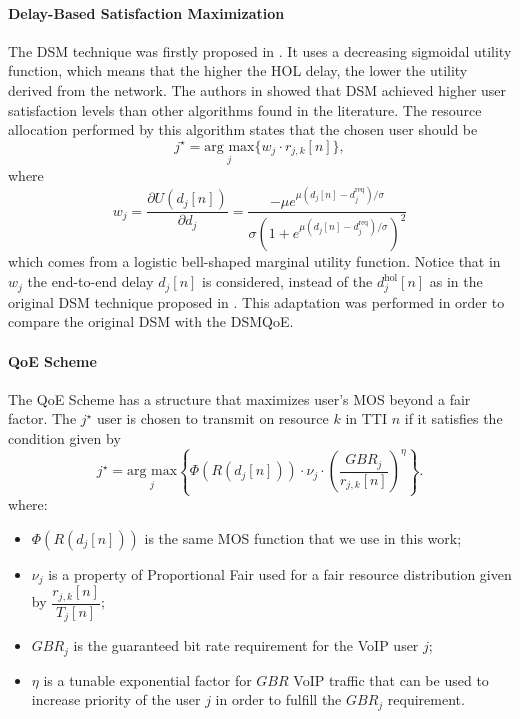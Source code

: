 \documentclass[conference]{IEEEtran}
\begin{document}
\paragraph{Delay-Based Satisfaction Maximization\\}
The \ac{DSM} technique was firstly proposed in \cite{Rodrigues2014_Wiley}. It uses a decreasing sigmoidal utility function, which means that the higher the HOL delay, the lower the utility derived from the network. The authors in \cite{Rodrigues2014_Wiley} showed that DSM achieved higher user satisfaction levels than other algorithms found in the literature. The resource allocation performed by this algorithm states that the chosen user should be 
\begin{equation}
\label{Eq:DSMArgmax}
j^{\star} = \underset{j}{\text{arg max}}\Big\{w_j \cdot {r_{j, k}[n]}\Big \},
\end{equation}
%
where
%
\begin{equation}
\label{DSMMarginal}
w_{j} = \dfrac{\partial U(d_{j}[n])}{\partial d_{j}} = \dfrac{- \mu  e^{\mu (d_{j}[n] - d_{j}^{\text{req}}) / \sigma}}{\sigma \left(1 + e^{\mu (d_{j}[n] - d_{j}^{\text{req}}) / \sigma}\right)^{2}}
\end{equation}
%
which comes from a logistic bell-shaped marginal utility function. Notice that in $w_{j}$ the end-to-end delay $d_{j}[n]$ is considered, instead of the $d_{j}^\mathrm{hol}\left[n\right]$  as in the original DSM technique proposed in \cite{Rodrigues2014_Wiley}. This adaptation was performed in order to compare the original DSM with the DSMQoE.

\paragraph{QoE Scheme\\} 
The QoE Scheme \cite{mushtaq2014qoe} has a structure that maximizes user's \ac{MOS} beyond a fair factor. The $j^\star$ user is chosen to transmit on resource $k$ in \ac{TTI} $n$ if it satisfies the condition given by
%
\begin{equation}
\label{Eq:QoESchemeArgmax}
j^{\star} = \underset{j}{\text{arg max}}\left\{ {{\Phi\left(R\left(d_j[n]\right)\right)\cdot \nu_j\cdot \left(\frac{GBR_j}{r_{j, k}[n]}\right)^\eta}}\right\}.
\end{equation}
%
where:
%
\begin{itemize}
	\item $\Phi\left(R\left(d_j[n]\right)\right)$ is the same \ac{MOS} function that we use in this work;
	\item $\nu_j$ is a property of Proportional Fair \cite{Kelly1997} used for a fair resource distribution given by $\dfrac{r_{j, k}[n]}{T_j[n]}$;
	\item $GBR_j$ is the guaranteed bit rate requirement for the \ac{VoIP} user $j$;
	\item $\eta$ is a tunable exponential factor for $GBR$ \ac{VoIP} traffic that can be used to increase priority of the user $j$ in order to fulfill the $GBR_j$ requirement.
\end{itemize}
\end{document}
